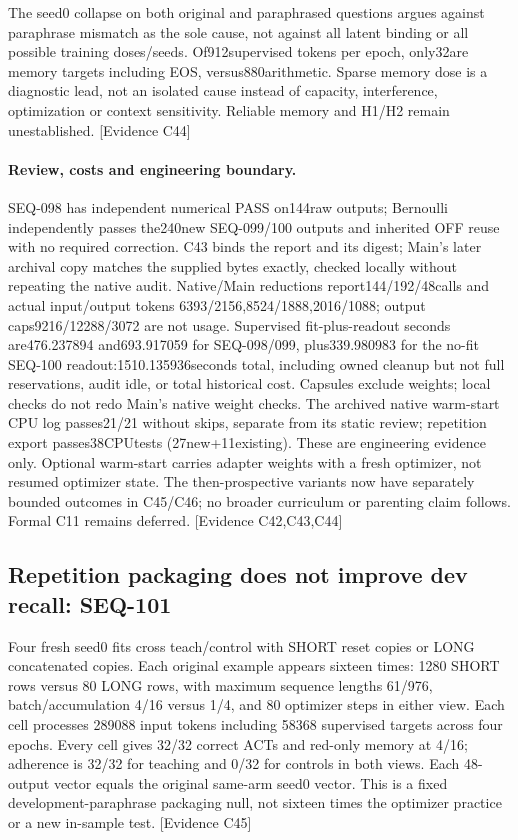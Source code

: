 \documentclass[11pt]{article}
\newcommand{\ev}[1]{\textsf{[Evidence #1]}}
\begin{document}
The seed0 collapse on both original and paraphrased questions argues against
paraphrase mismatch as the sole cause, not against all latent binding or all
possible training doses/seeds. Of912supervised tokens per epoch, only32are
memory targets including EOS, versus880arithmetic. Sparse memory dose is a
diagnostic lead, not an isolated cause instead of capacity, interference,
optimization or context sensitivity. Reliable memory and H1/H2 remain unestablished. \ev{C44}

\paragraph{Review, costs and engineering boundary.} SEQ-098 has independent
numerical PASS on144raw outputs; Bernoulli independently passes the240new
SEQ-099/100 outputs and inherited OFF reuse with no required correction.
C43 binds the report and its digest; Main's later archival copy matches the
supplied bytes exactly, checked locally without repeating the native audit.
Native/Main reductions report144/192/48calls and actual input/output tokens
6393/2156,8524/1888,2016/1088; output caps9216/12288/3072 are not usage.
Supervised fit-plus-readout seconds are476.237894 and693.917059 for SEQ-098/099,
plus339.980983 for the no-fit SEQ-100 readout:1510.135936seconds total, including
owned cleanup but not full reservations, audit idle, or total historical cost.
Capsules exclude weights; local checks do not redo Main's native weight checks.
The archived native warm-start CPU log passes21/21 without skips, separate
from its static review; repetition export passes38CPUtests (27new+11existing).
These are engineering evidence only. Optional warm-start carries adapter weights
with a fresh optimizer, not resumed optimizer state. The then-prospective variants
now have separately bounded outcomes in C45/C46; no broader curriculum or parenting
claim follows. Formal C11 remains deferred. \ev{C42,C43,C44}

\subsection{Repetition packaging does not improve dev recall: SEQ-101}
Four fresh seed0 fits cross teach/control with SHORT reset copies or LONG
concatenated copies. Each original example appears sixteen times: 1280 SHORT
rows versus 80 LONG rows, with maximum sequence lengths 61/976, batch/accumulation
4/16 versus 1/4, and 80 optimizer steps in either view. Each cell processes
289088 input tokens including 58368 supervised targets across four epochs.
Every cell gives 32/32 correct ACTs and red-only memory at 4/16; adherence is
32/32 for teaching and 0/32 for controls in both views. Each 48-output vector
equals the original same-arm seed0 vector. This is a fixed development-paraphrase
packaging null, not sixteen times the optimizer practice or a new in-sample test. \ev{C45}
\end{document}
